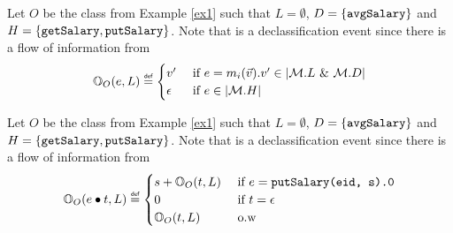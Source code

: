 \documentclass[acmsmall,screen,review, nonacm]{acmart}
\begin{document}
\begin{example} \label{ex2}
  Let $O$ be the class from Example \ref{ex1} such that  $L = \emptyset $, $D = \{ \texttt{avgSalary} \}$ and $H = \{\texttt{getSalary}, \texttt{putSalary} \}$.
  Note that  is a declassification event since there is a flow of information from 
  \[
  \ob{e}{O}{L} \isdef \begin{cases}
    v'  & \mbox{ if } e = m_i(\vec{v}).v' \in \abs{\classpart.L \directprod \classpart.D} \\
    \emptytr & \mbox{ if } e \in \abs{\classpart.H}
  \end{cases}
  \]
\end{example}



\begin{example}  \label{ex3}
  Let $O$ be the class from Example \ref{ex1} such that  $L = \emptyset $, $D = \{ \texttt{avgSalary} \}$ and $H = \{\texttt{getSalary}, \texttt{putSalary} \}$.
  Note that  is a declassification event since there is a flow of information from 
  \[
  \ob{e \tracecat t }{O}{L} \isdef \begin{cases}
    s + \ob{t}{O}{L}  & \mbox{ if } e = \mycode{putSalary(eid, s).0} \\
    0 & \mbox{ if } t = \epsilon \\
    \ob{t}{O}{L} & \mbox{ o.w } 
  \end{cases}
  \]
\end{example}


\end{document}
